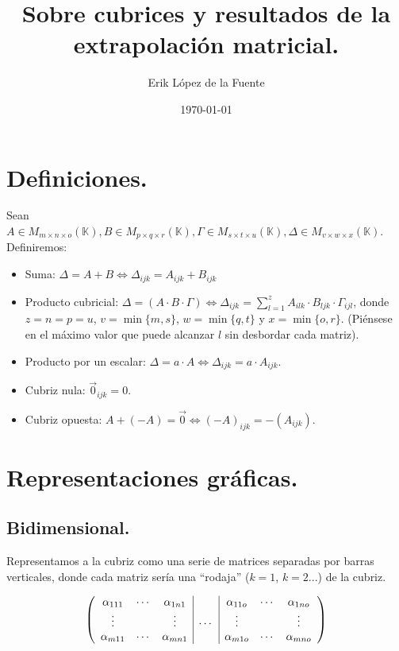 \documentclass[a4paper, titlepage]{article}
\title{Sobre cubrices y resultados de la extrapolación matricial.}
\author{Erik López de la Fuente}
\date{\today}
\begin{document}
\maketitle
\tableofcontents
\newpage

\section{Definiciones.}

Sean $A \in M_{m\times n\times o} (\mathbb{K}), B \in M_{p\times q\times r} (\mathbb{K}), \Gamma \in M_{s\times t\times u} (\mathbb{K}), \Delta \in M_{v\times w\times x} (\mathbb{K})$. Definiremos:

\begin{itemize}
	\item Suma: $\Delta = A + B \Leftrightarrow \Delta_{ijk} = A_{ijk} + B_{ijk}$
	\item Producto cubricial: $\Delta = (A\cdot B\cdot \Gamma) \Leftrightarrow \Delta_{ijk} = \sum\limits_{l=1}^{z} A_{ilk} \cdot B_{ljk} \cdot \Gamma_{ijl}$, donde $z = n = p = u$, $v = \min \{m, s\}$, $w = \min \{q, t\}$ y $x = \min \{o, r\}$. (Piénsese en el máximo valor que puede alcanzar $l$ sin desbordar cada matriz).
	\item Producto por un escalar: $\Delta = a\cdot A \Leftrightarrow \Delta_{ijk} = a \cdot A_{ijk}$.
	\item Cubriz nula: $\vec{0}_{ijk} = 0$.
	\item Cubriz opuesta: $A + (-A) = \vec{0} \Leftrightarrow (-A)_{ijk} = -(A_{ijk})$.
\end{itemize}


\section{Representaciones gráficas.}

\subsection{Bidimensional.}

Representamos a la cubriz como una serie de matrices separadas por barras verticales, donde cada matriz sería una ``rodaja'' ($k=1$, $k=2$...) de la cubriz.

\[ \left(
\begin{array}{c c c | c | c c c}
	\alpha_{111} & \cdots & \alpha_{1n1} &        & \alpha_{11o} & \cdots & \alpha_{1no} \\
	\vdots       &        & \vdots       & \cdots & \vdots       &        & \vdots       \\
	\alpha_{m11} & \cdots & \alpha_{mn1} &        & \alpha_{m1o} & \cdots & \alpha_{mno} \\
\end{array} \right)
\]
\end{document}

